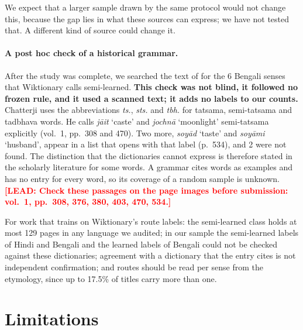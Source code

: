 \documentclass[11pt]{article}
\newcommand{\lead}[1]{\textcolor{red}{\textbf{[LEAD: #1]}}}
\newcommand{\gl}[1]{`#1'}
\begin{document}
We expect that a larger sample drawn by the same protocol would not change this, because the gap lies in what these sources can express; we have not tested that. A different kind of source could change it.

\paragraph{A post hoc check of a historical grammar.} After the study was complete, we searched the text of \citet{chatterji1926} for the 6 Bengali senses that Wiktionary calls semi-learned. \textbf{This check was not blind, it followed no frozen rule, and it used a scanned text; it adds no labels to our counts.} Chatterji uses the abbreviations \textit{ts.}, \textit{sts.} and \textit{tbh.} for tatsama, semi-tatsama and tadbhava words. He calls \textit{j\=ait} \gl{caste} and \textit{jochn\=a} \gl{moonlight} semi-tatsama explicitly (vol.~1, pp.~308 and 470). Two more, \textit{soy\=ad} \gl{taste} and \textit{soy\=ami} \gl{husband}, appear in a list that opens with that label (p.~534), and 2 were not found. The distinction that the dictionaries cannot express is therefore stated in the scholarly literature for some words. A grammar cites words as examples and has no entry for every word, so its coverage of a random sample is unknown. \lead{Check these passages on the page images before submission: vol.~1, pp.~308, 376, 380, 403, 470, 534.}

For work that trains on Wiktionary's route labels: the semi-learned class holds at most 129 pages in any language we audited; in our sample the semi-learned labels of Hindi and Bengali and the learned labels of Bengali could not be checked against these dictionaries; agreement with a dictionary that the entry cites is not independent confirmation; and routes should be read per sense from the etymology, since up to 17.5\% of titles carry more than one.

\section*{Limitations}
\end{document}

